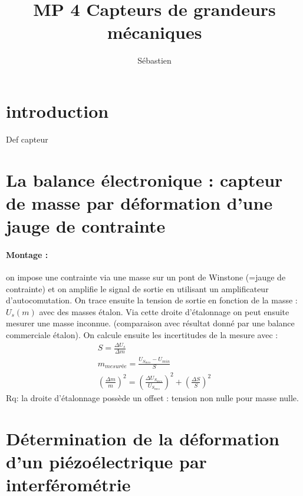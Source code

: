 \documentclass[12pt,prb,aps,epsf]{report}
\begin{document}
	
	\title{MP 4 Capteurs de grandeurs mécaniques}
	\author{Sébastien}
	
	\maketitle
	
	\tableofcontents
	
	\pagebreak
	
\section{introduction}
Def capteur
	
\section{La balance électronique : capteur de masse par déformation d'une jauge de contrainte}
\paragraph{Montage :} on impose une contrainte via une masse sur un pont de Winstone (=jauge de contrainte) et on amplifie le signal de sortie en utilisant un amplificateur d'autocomutation. On trace ensuite la tension de sortie en fonction de la masse : $U_s(m)$ avec des masses étalon. Via cette droite d'étalonnage on peut ensuite mesurer une masse inconnue. (comparaison avec résultat donné par une balance commerciale étalon). On calcule ensuite les incertitudes de la mesure avec :
\begin{eqnarray}
S=\frac{\Delta U_s}{\Delta m}\\
m_{mesurée} = \frac{U_{S_{mes}}-U_{min}}{S}\\
\left(\frac{\Delta m}{m}\right)^2 = \left(\frac{\Delta U_{S_{mes}}}{U_{S_{mes}}}\right)^2 + \left(\frac{\Delta S}{S}\right)^2
\end{eqnarray}
Rq: la droite d'étalonnage possède un offset : tension non nulle pour masse nulle.
\section{Détermination de la déformation d'un piézoélectrique par interférométrie}
\end{document}

